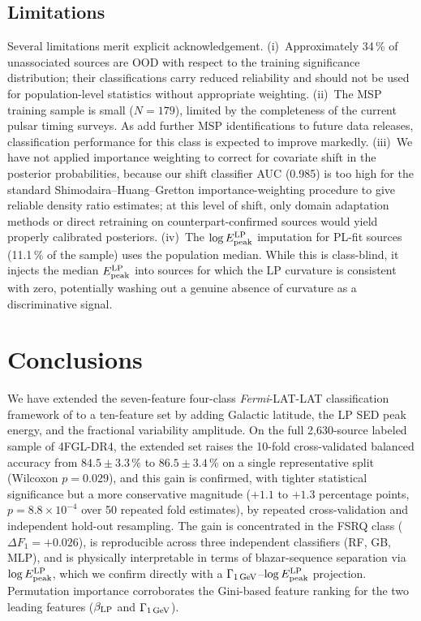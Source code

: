 \documentclass[fleqn,12pt]{article}
\newcommand{\fermi}{\textit{Fermi}-LAT}
\newcommand{\fgl}{4FGL-DR4}
\newcommand{\GamLP}{\Gamma_{\rm 1\,GeV}}
\newcommand{\betaLP}{\beta_{\rm LP}}
\newcommand{\Epeak}{E^{\rm LP}_{\rm peak}}
\begin{document}
\subsection{Limitations}
\label{ssec:limits}

Several limitations merit explicit acknowledgement.
(i)~Approximately 34\,\% of unassociated sources are OOD with respect
to the training significance distribution; their classifications carry
reduced reliability and should not be used for population-level
statistics without appropriate weighting.
(ii)~The MSP training sample is small ($N = 179$), limited by the
completeness of the current pulsar timing surveys. As
\citet{Smith2023} add further MSP identifications to future data
releases, classification performance for this class is expected to
improve markedly.
(iii)~We have not applied importance weighting to correct for
covariate shift in the posterior probabilities, because our shift
classifier AUC (0.985) is too high for the standard
Shimodaira--Huang--Gretton importance-weighting procedure to give
reliable density ratio estimates; at this level of shift, only
domain adaptation methods or direct retraining on counterpart-confirmed
sources would yield properly calibrated posteriors.
(iv)~The $\log\Epeak$ imputation for PL-fit sources (11.1\,\% of the
sample) uses the population median. While this is class-blind, it
injects the median $\Epeak$ into sources for which the LP curvature
is consistent with zero, potentially washing out a genuine absence of
curvature as a discriminative signal.

\section{Conclusions}
\label{sec:conc}

We have extended the seven-feature four-class \fermi{}-LAT
classification framework of \citet{Malyshev2023} to a ten-feature set
by adding Galactic latitude, the LP SED peak energy, and the
fractional variability amplitude. On the full 2,630-source labeled
sample of \fgl{}, the extended set raises the 10-fold cross-validated
balanced accuracy from $84.5 \pm 3.3\,\%$ to $86.5 \pm 3.4\,\%$ on a
single representative split (Wilcoxon $p = 0.029$), and this gain is
confirmed, with tighter statistical significance but a more
conservative magnitude ($+1.1$ to $+1.3$ percentage points,
$p = 8.8\times10^{-4}$ over 50 repeated fold estimates), by repeated
cross-validation and independent hold-out resampling. The gain is
concentrated in the FSRQ class ($\Delta F_1 = +0.026$), is reproducible
across three independent classifiers (RF, GB, MLP), and is physically
interpretable in terms of blazar-sequence separation via $\log\Epeak$,
which we confirm directly with a $\GamLP$--$\log\Epeak$ projection.
Permutation importance corroborates the Gini-based feature ranking for
the two leading features ($\betaLP$ and $\GamLP$).
\end{document}
